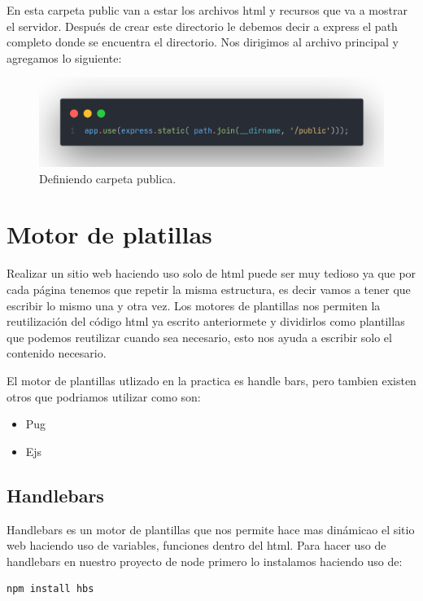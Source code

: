\documentclass[12pt]{article}
\begin{document}
En esta carpeta public van a estar los archivos html y recursos que va a mostrar el servidor. Después de crear este directorio le debemos decir a express el path completo donde se encuentra el directorio. Nos dirigimos al archivo principal y agregamos lo siguiente:

\begin{figure}[H]
  \centering
  \includegraphics[scale=.3]{assets/images/static-folder.png}
  \caption{Definiendo carpeta publica.}
\end{figure}


\section{Motor de platillas}

Realizar un sitio web haciendo uso solo de html puede ser muy tedioso ya que por cada página tenemos que repetir la misma estructura, es decir vamos a tener que escribir lo mismo una y otra vez. Los motores de plantillas nos permiten la reutilización del código html ya escrito anteriormete y dividirlos como plantillas que podemos reutilizar cuando sea necesario, esto nos ayuda a escribir solo el contenido necesario.

El motor de plantillas utlizado en la practica es handle bars, pero tambien existen otros que podriamos utilizar como son:

\begin{itemize}
  \item Pug
  \item Ejs
\end{itemize}

\subsection{Handlebars}

Handlebars es un motor de plantillas que nos permite hace mas dinámicao el sitio web haciendo uso de variables, funciones dentro del html. Para hacer uso de handlebars en nuestro proyecto de node primero lo instalamos haciendo uso de:

\begin{lstlisting}[numbers=none]
  npm install hbs
\end{lstlisting}
\end{document}
